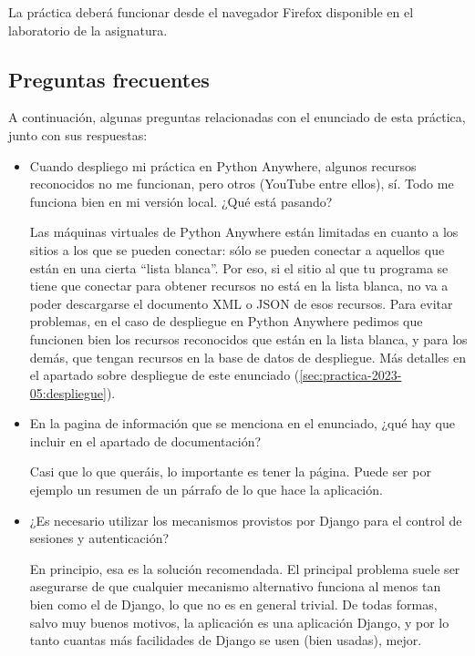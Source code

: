 La práctica deberá funcionar desde el navegador Firefox disponible en el laboratorio de la asignatura.

\subsection{Preguntas frecuentes}
\label{sec:practica-2023-05:preguntas}

A continuación, algunas preguntas relacionadas con el enunciado de esta práctica, junto con sus respuestas:

\begin{itemize}

\item Cuando despliego mi práctica en Python Anywhere, algunos recursos reconocidos no me funcionan, pero otros (YouTube entre ellos), sí. Todo me funciona bien en mi versión local. ¿Qué está pasando?

  Las máquinas virtuales de Python Anywhere están limitadas en cuanto a los sitios a los que se pueden conectar: sólo se pueden conectar a aquellos que están en una cierta ``lista blanca''. Por eso, si el sitio al que tu programa se tiene que conectar para obtener recursos no está en la lista blanca, no va a poder descargarse el documento XML o JSON de esos recursos. Para evitar problemas, en el caso de despliegue en Python Anywhere pedimos que funcionen bien los recursos reconocidos que están en la lista blanca, y para los demás, que tengan recursos en la base de datos de despliegue. Más detalles en el apartado sobre despliegue de este enunciado (\ref{sec:practica-2023-05:despliegue}).
  
\item En la pagina de información que se menciona en el enunciado, ¿qué hay que incluir en el apartado de documentación?

Casi que lo que queráis, lo importante es tener la página. Puede ser por ejemplo un resumen de un párrafo de lo que hace la aplicación.
  
\item ¿Es necesario utilizar los mecanismos provistos por Django para el control de sesiones y autenticación?

  En principio, esa es la solución recomendada. El principal problema suele ser asegurarse de que cualquier mecanismo alternativo funciona al menos tan bien como el de Django, lo que no es en general trivial. De todas formas, salvo muy buenos motivos, la aplicación es una aplicación Django, y por lo tanto cuantas más facilidades de Django se usen (bien usadas), mejor.


\end{itemize}
